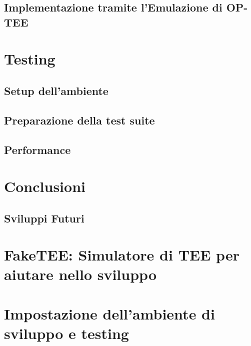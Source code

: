 \documentclass[12pt,italian]{report}
\begin{document}
\section{Implementazione tramite l'Emulazione di OP-TEE}
\label{sec:implementazione-passthrough-tramite-bootloader}

\chapter{Testing}
\label{chap:testing}

\section{Setup dell'ambiente}
\label{sec:setup-ambiente}

\section{Preparazione della test suite}
\label{sec:preparazione-test-suite}

\section{Performance}
\label{sec:performance}

\chapter{Conclusioni}
\label{chap:conclusioni}


\section{Sviluppi Futuri}
\label{sec:sviluppi-futuri}

\appendix
\chapter{FakeTEE: Simulatore di TEE per aiutare nello sviluppo}
\label{chap:faketee}

\chapter{Impostazione dell'ambiente di sviluppo e testing}
\label{chap:impostazione-ambiente-sviluppo-testing}



\end{document}
